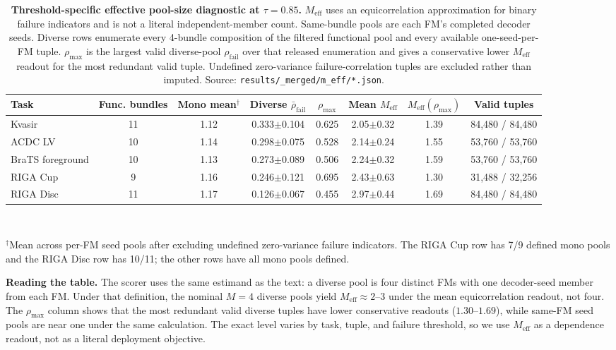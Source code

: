 \begin{table}[!htbp]
  \caption{\textbf{Threshold-specific effective pool-size diagnostic at $\tau{=}0.85$.}
  $M_{\mathrm{eff}}$ uses an equicorrelation approximation for binary failure
  indicators and is not a literal independent-member count. Same-bundle pools are each FM's completed decoder seeds. Diverse rows enumerate
  every 4-bundle composition of the filtered functional pool and every available
  one-seed-per-FM tuple. $\rho_{\max}$ is the largest valid diverse-pool
  $\rho_{\mathrm{fail}}$ over that released enumeration and gives a conservative
  lower $M_{\mathrm{eff}}$ readout for the most redundant valid tuple. Undefined
  zero-variance failure-correlation tuples are excluded rather than imputed.
  Source: \texttt{results/\_merged/m\_eff/*.json}.}
  \label{tab:meff}
  \centering\scriptsize
  \setlength{\tabcolsep}{2.2pt}
  \begin{tabular*}{\linewidth}{@{\extracolsep{\fill}}lccccccc}
    \toprule
    Task & Func. bundles & Mono mean$^{\dag}$ & Diverse $\bar\rho_{\mathrm{fail}}$ & $\rho_{\max}$ & Mean $M_{\mathrm{eff}}$ & $M_{\mathrm{eff}}(\rho_{\max})$ & Valid tuples \\
    \midrule
    Kvasir     & 11 & 1.12 & 0.333$\pm$0.104 & 0.625 & 2.05$\pm$0.32 & 1.39 & 84{,}480 / 84{,}480 \\
    ACDC LV    & 10 & 1.14 & 0.298$\pm$0.075 & 0.528 & 2.14$\pm$0.24 & 1.55 & 53{,}760 / 53{,}760 \\
    BraTS foreground   & 10 & 1.13 & 0.273$\pm$0.089 & 0.506 & 2.24$\pm$0.32 & 1.59 & 53{,}760 / 53{,}760 \\
    RIGA Cup   & 9  & 1.16 & 0.246$\pm$0.121 & 0.695 & 2.43$\pm$0.63 & 1.30 & 31{,}488 / 32{,}256 \\
    RIGA Disc  & 11 & 1.17 & 0.126$\pm$0.067 & 0.455 & 2.97$\pm$0.44 & 1.69 & 84{,}480 / 84{,}480 \\
    \bottomrule
  \end{tabular*}
  \\[2pt]
  {\footnotesize \parbox{0.92\linewidth}{$^{\dag}$Mean across per-FM seed pools after excluding undefined zero-variance failure indicators. The RIGA Cup row has 7/9 defined mono pools and the RIGA Disc row has 10/11; the other rows have all mono pools defined.}}
\end{table}

\textbf{Reading the table.} The scorer uses the same estimand as
the text: a diverse pool is four distinct FMs with one decoder-seed member from
each FM. Under that definition, the nominal $M{=}4$ diverse pools yield
$M_{\mathrm{eff}}\approx2$--3 under the mean equicorrelation readout, not four.
The $\rho_{\max}$ column shows that the most redundant valid diverse tuples have
lower conservative readouts ($1.30$--$1.69$), while same-FM seed pools are near
one under the same calculation. The exact level varies by task, tuple, and
failure threshold, so we use $M_{\mathrm{eff}}$ as a dependence readout, not as a
literal deployment objective.

